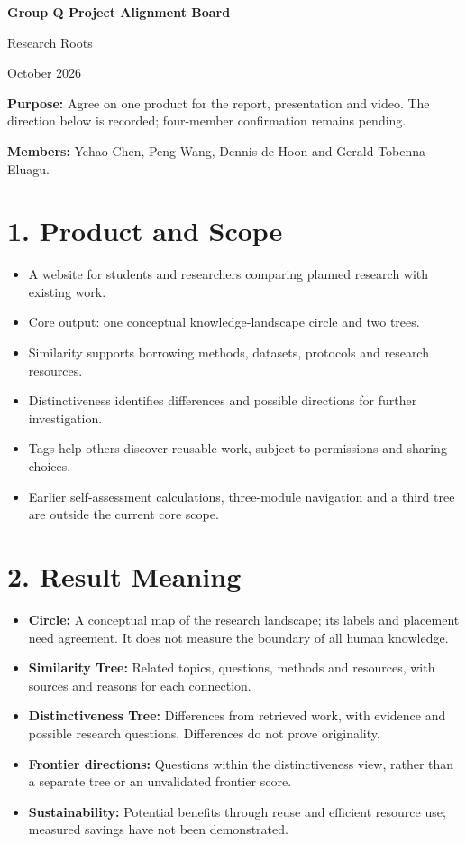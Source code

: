 \documentclass[10pt,a4paper]{article}
\begin{document}
\begin{center}
{\LARGE\bfseries Group Q Project Alignment Board}\par
\smallskip
{\large Research Roots}\par
{} October 2026
\end{center}

\textbf{Purpose:} Agree on one product for the report, presentation and video.
The direction below is recorded; four-member confirmation remains pending.

\textbf{Members:} Yehao Chen, Peng Wang, Dennis de Hoon and Gerald Tobenna Eluagu.

\section*{1. Product and Scope}
\begin{itemize}
\item A website for students and researchers comparing planned research with existing work.
\item Core output: one conceptual knowledge-landscape circle and two trees.
\item Similarity supports borrowing methods, datasets, protocols and research resources.
\item Distinctiveness identifies differences and possible directions for further investigation.
\item Tags help others discover reusable work, subject to permissions and sharing choices.
\item Earlier self-assessment calculations, three-module navigation and a third tree are outside the current core scope.
\end{itemize}

\section*{2. Result Meaning}
\begin{itemize}
\item \textbf{Circle:} A conceptual map of the research landscape; its labels and placement need agreement. It does not measure the boundary of all human knowledge.
\item \textbf{Similarity Tree:} Related topics, questions, methods and resources, with sources and reasons for each connection.
\item \textbf{Distinctiveness Tree:} Differences from retrieved work, with evidence and possible research questions. Differences do not prove originality.
\item \textbf{Frontier directions:} Questions within the distinctiveness view, rather than a separate tree or an unvalidated frontier score.
\item \textbf{Sustainability:} Potential benefits through reuse and efficient resource use; measured savings have not been demonstrated.
\end{itemize}
\end{document}
